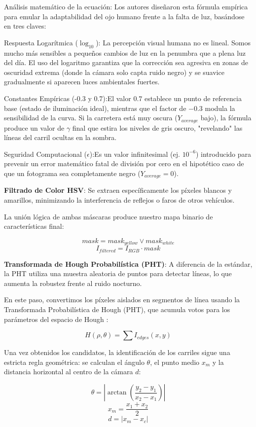 \documentclass{article}
\begin{document}
Análisis matemático de la ecuación:
Los autores diseñaron esta fórmula empírica para emular la adaptabilidad del ojo humano frente a la falta de luz, basándose en tres claves:

Respuesta Logarítmica ($\log_{10}$): La percepción visual humana no es lineal. Somos mucho más sensibles a pequeños cambios de luz en la penumbra que a plena luz del día. El uso del logaritmo garantiza que la corrección sea agresiva en zonas de oscuridad extrema (donde la cámara solo capta ruido negro) y se suavice gradualmente si aparecen luces ambientales fuertes.

Constantes Empíricas (-0.3 y 0.7):El valor $0.7$ establece un punto de referencia base (estado de iluminación ideal), mientras que el factor de $-0.3$ modula la sensibilidad de la curva. Si la carretera está muy oscura ($Y_{average}$ bajo), la fórmula produce un valor de $\gamma$ final que estira los niveles de gris oscuro, "revelando" las líneas del carril ocultas en la sombra.

Seguridad Computacional ($\epsilon$):Es un valor infinitesimal (ej. $10^{-6}$) introducido para prevenir un error matemático fatal de división por cero en el hipotético caso de que un fotograma sea completamente negro ($Y_{average} = 0$).


\textbf{Filtrado de Color HSV}: Se extraen específicamente los píxeles blancos y amarillos, minimizando la interferencia de reflejos o faros de otros vehículos.

La unión lógica de ambas máscaras produce nuestro mapa binario de características final:

$$mask = mask_{yellow} \lor mask_{white}$$
$$I_{filtered} = I_{RGB} \cdot mask$$

\textbf{Transformada de Hough Probabilística (PHT)}: A diferencia de la estándar, la PHT utiliza una muestra aleatoria de puntos para detectar líneas, lo que aumenta la robustez frente al ruido nocturno.

En este paso, convertimos los píxeles aislados en segmentos de línea usando la Transformada Probabilística de Hough (PHT), que acumula votos para los parámetros del espacio de Hough :

$$H(\rho, \theta) = \sum I_{edges}(x,y)$$

Una vez obtenidos los candidatos, la identificación de los carriles sigue una estricta regla geométrica: se calculan el ángulo $\theta$, el punto medio $x_m$ y la distancia horizontal al centro de la cámara $d$:

$$\theta = \left| \arctan \left( \frac{y_2 - y_1}{x_2 - x_1} \right) \right|$$
$$x_m = \frac{x_1 + x_2}{2}$$
$$d = |x_m - x_c|$$
\end{document}
